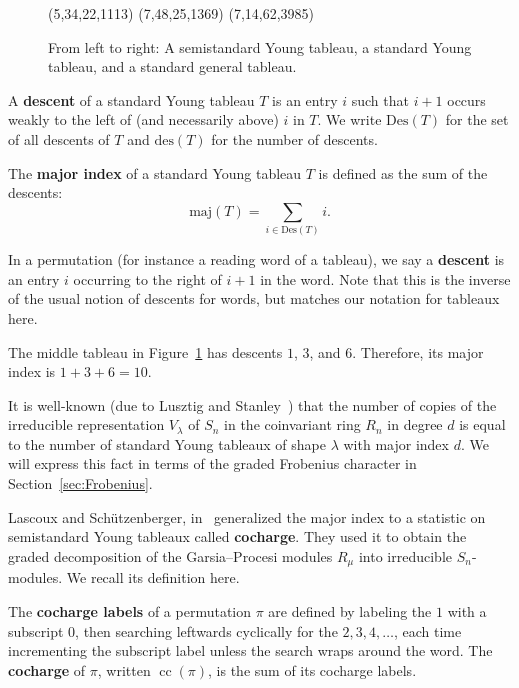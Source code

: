\documentclass[ALCO,Unicode]{cedram}
\DeclareMathOperator{\cc}{cc}
\newcommand{\maj}{\mathrm{maj}}
\newcommand{\Des}{\mathrm{Des}}
\newcommand{\des}{\mathrm{des}}
\begin{document}
\begin{figure}
	\centering
	\young(5,34,22,1113) \hspace{1cm} \young(7,48,25,1369) \hspace{1cm} \young(7,14,62,3985)
	\caption{From left to right: A semistandard Young tableau, a standard Young tableau, and a standard general tableau.} 
	\label{fig:tableaux}
\end{figure}

\begin{definition}
	A \textbf{descent} of a standard Young tableau $T$ is an entry $i$ such that $i+1$ occurs weakly to the left of (and necessarily above) $i$ in $T$.  We write $\Des(T)$ for the set of all descents of $T$ and $\des(T)$ for the number of descents.
	
	The \textbf{major index} of a standard Young tableau $T$ is defined as the sum of the descents: $$\maj(T)=\sum_{i\in \Des(T)} i.$$
	
	In a permutation (for instance a reading word of a tableau), we say a \textbf{descent} is an entry $i$ occurring to the right of $i+1$ in the word.  Note that this is the inverse of the usual notion of descents for words, but matches our notation for tableaux here.
\end{definition}

\begin{example}
	The middle tableau in Figure~\ref{fig:tableaux} has descents $1$, $3$, and $6$.  Therefore, its major index is $1+3+6=10$.
\end{example}

It is well-known (due to Lusztig and Stanley~\cite{Stanley}) that the number of copies of the irreducible representation $V_\lambda$ of $S_n$ in the coinvariant ring $R_n$ in degree $d$ is equal to the number of standard Young tableaux of shape $\lambda$ with major index $d$.  We will express this fact in terms of the graded Frobenius character in Section~\ref{sec:Frobenius}. 

Lascoux and Sch\"utzenberger, in~\cite{LascouxSchutzenberger} generalized the major index to a statistic on semistandard Young tableaux called \textbf{cocharge}.  They used it to obtain the graded decomposition of the Garsia--Procesi modules $R_\mu$ into irreducible $S_n$-modules.  We recall its definition here.

\begin{definition}
	The \textbf{cocharge labels} of a permutation $\pi$ are defined by labeling the $1$ with a subscript $0$, then searching leftwards cyclically for the $2,3,4,\ldots$, each time incrementing the subscript label unless the search wraps around the word.  The \textbf{cocharge} of $\pi$, written $\cc(\pi)$, is the sum of its cocharge labels.
\end{definition}
\end{document}
